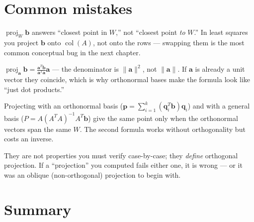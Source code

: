 \section{Common mistakes}

\begin{tripwire}
$\operatorname{proj}_W\mathbf b$ answers ``closest point in $W$,'' not
``closest point \emph{to} $W$.'' In least squares you project $\mathbf b$
onto $\operatorname{col}(A)$, not onto the rows --- swapping them is the
most common conceptual bug in the next chapter.
\end{tripwire}

\begin{tripwire}
$\operatorname{proj}_{\mathbf a}\mathbf b
=\frac{\mathbf a^{T}\mathbf b}{\mathbf a^{T}\mathbf a}\mathbf a$ --- the
denominator is $\|\mathbf a\|^2$, not $\|\mathbf a\|$. If $\mathbf a$ is
already a unit vector they coincide, which is why orthonormal bases make
the formula look like ``just dot products.''
\end{tripwire}

\begin{tripwire}
Projecting with an orthonormal basis ($\mathbf p=\sum_{i=1}^{k}(\mathbf q_i^{T}\mathbf b)\mathbf q_i$)
and with a general basis ($P=A(A^{T}A)^{-1}A^{T}\mathbf b$) give the same
point only when the orthonormal vectors span the same $W$. The second
formula works without orthogonality but costs an inverse.
\end{tripwire}

\begin{tripwire}[{Assuming $P^2=P$ and $P^{T}=P$ are optional properties}]
They are not properties you must verify case-by-case; they \emph{define}
orthogonal projection. If a ``projection'' you computed fails either one,
it is wrong --- or it was an oblique (non-orthogonal) projection to begin
with.
\end{tripwire}

\section{Summary}

